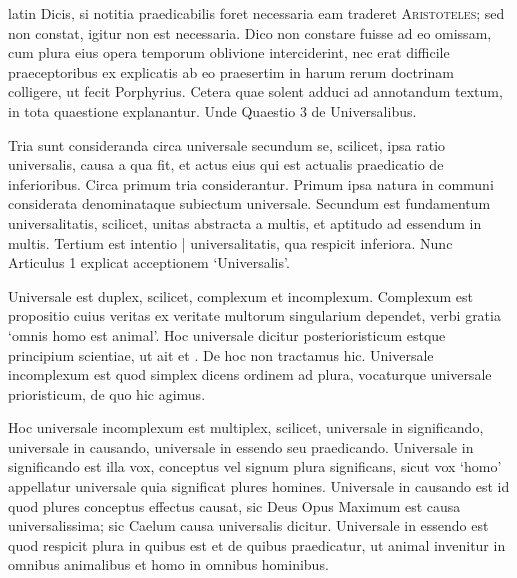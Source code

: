 \begin{otherlanguage*}{latin}
\pstart
Dicis, si notitia praedicabilis foret necessaria eam traderet \textsc{Aristoteles}; sed non constat, igitur non est necessaria. Dico non constare fuisse ad eo omissam, cum plura eius opera temporum oblivione interciderint, nec erat difficile praeceptoribus ex explicatis ab eo praesertim in  harum rerum doctrinam colligere, ut fecit Porphyrius. Cetera quae solent adduci ad annotandum textum, in tota quaestione explanantur. Unde Quaestio 3 de Universalibus. 
\pend

\pstart
{}
\pend

\pstart
Tria sunt consideranda circa universale secundum se, scilicet, ipsa ratio universalis, causa a qua fit, et actus eius qui est actualis praedicatio de inferioribus. Circa primum tria considerantur. Primum ipsa natura in communi considerata denominataque subiectum universale. Secundum est fundamentum universalitatis, scilicet, unitas abstracta a multis, et aptitudo ad essendum in multis. Tertium est intentio \textnormal{|} universalitatis, qua respicit inferiora. Nunc Articulus 1 explicat acceptionem `Universalis'. 
\pend

\pstart
{}
\pend

\pstart
Universale est duplex, scilicet, complexum et incomplexum. Complexum est propositio cuius veritas ex veritate multorum singularium dependet, verbi gratia `omnis homo est animal'. Hoc universale dicitur posterioristicum estque principium scientiae, ut ait  et . De hoc non tractamus hic. Universale incomplexum est quod simplex dicens ordinem ad plura, vocaturque universale prioristicum, de quo hic agimus. 
\pend

\pstart
Hoc universale incomplexum est multiplex, scilicet, universale in significando, universale in causando, universale in essendo seu praedicando. Universale in significando est illa vox, conceptus vel signum plura significans, sicut vox `homo' appellatur universale quia significat plures homines. Universale in causando est id quod plures conceptus effectus causat, sic Deus Opus Maximum est causa universalissima; sic Caelum causa universalis dicitur. Universale in essendo est quod respicit plura in quibus est et de quibus praedicatur, ut animal invenitur in omnibus animalibus et homo in omnibus hominibus. 
\pend


\end{otherlanguage*}
